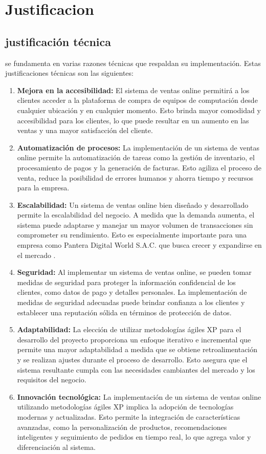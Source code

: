 \documentclass[12pt,a4paper]{article}
\newcommand{\newsection}[1]{\section{\hspace{6mm} #1}}%
\newcommand{\newsubsection}[1]{\subsection{\hspace{5mm} #1}}
\newcommand{\empresa}{Pantera Digital World S.A.C. }
\begin{document}
\newpage
\newsection{Justificacion}
\newsubsection{justificación técnica}
se fundamenta en varias razones técnicas que respaldan su implementación. Estas justificaciones técnicas son las siguientes:
\begin{enumerate}
\item \textbf{Mejora en la accesibilidad:} El sistema de ventas online permitirá a los clientes acceder a la plataforma de compra de equipos de computación desde cualquier ubicación y en cualquier momento. Esto brinda mayor comodidad y accesibilidad para los clientes, lo que puede resultar en un aumento en las ventas y una mayor satisfacción del cliente.
\item \textbf{Automatización de procesos:} La implementación de un sistema de ventas online permite la automatización de tareas como la gestión de inventario, el procesamiento de pagos y la generación de facturas. Esto agiliza el proceso de venta, reduce la posibilidad de errores humanos y ahorra tiempo y recursos para la empresa.
\item \textbf{Escalabilidad:} Un sistema de ventas online bien diseñado y desarrollado permite la escalabilidad del negocio. A medida que la demanda aumenta, el sistema puede adaptarse y manejar un mayor volumen de transacciones sin comprometer su rendimiento. Esto es especialmente importante para una empresa como \empresa que busca crecer y expandirse en el mercado .
\item \textbf{Seguridad:} Al implementar un sistema de ventas online, se pueden tomar medidas de seguridad para proteger la información confidencial de los clientes, como datos de pago y detalles personales. La implementación de medidas de seguridad adecuadas puede brindar confianza a los clientes y establecer una reputación sólida en términos de protección de datos.
\item \textbf{Adaptabilidad:} La elección de utilizar metodologías ágiles XP para el desarrollo del proyecto proporciona un enfoque iterativo e incremental que permite una mayor adaptabilidad a medida que se obtiene retroalimentación y se realizan ajustes durante el proceso de desarrollo. Esto asegura que el sistema resultante cumpla con las necesidades cambiantes del mercado y los requisitos del negocio.
\item \textbf{Innovación tecnológica:} La implementación de un sistema de ventas online utilizando metodologías ágiles XP implica la adopción de tecnologías modernas y actualizadas. Esto permite la integración de características avanzadas, como la personalización de productos, recomendaciones inteligentes y seguimiento de pedidos en tiempo real, lo que agrega valor y diferenciación al sistema.
\end{enumerate}
\end{document}
